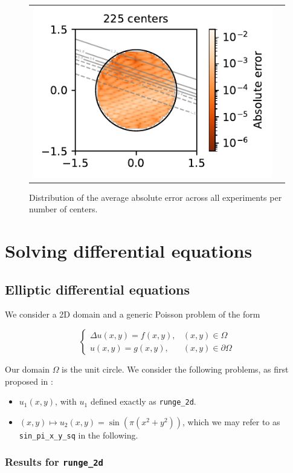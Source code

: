 \documentclass[12pt]{report} %
\newcommand{\mathLaplace}{\Delta}
\begin{document}
\begin{figure}
\begin{tabular}{ccl}
    \multicolumn{2}{l}{\includegraphics[width=.4\textwidth, clip=true,trim={0 0 2.1cm 0}]{imagenes/experiments/2d/statistical_2d_full_scheduler_interpolation/arctan_2d/arctan_paper_2d_225.pdf}} &
  \end{tabular}
  \caption{Distribution of the average absolute error across all experiments per number of centers.}
  \label{fig:arctan-2d-results-errors-avg}
\end{figure}

\clearpage
\section{Solving differential equations}

\subsection*{Elliptic differential equations}

We consider a 2D domain and a generic Poisson problem of the form

\begin{equation}
  \left\{\begin{array}{ll}
    \mathLaplace u (x, y) = f (x, y), & (x, y) \in \Omega          \\
    u (x, y) = g (x, y),              & (x, y) \in \partial \Omega
  \end{array}\right. \label{eqn:poisson}
\end{equation}

Our domain $\Omega$ is the unit circle. We consider the following problems, as first proposed in \cite{larsson2003numerical}:

\begin{itemize}
  \item $u_1(x,y)$, with $u_1$ defined exactly as \texttt{runge\_2d}.
  \item $(x,y) \mapsto u_2(x,y)=\sin(\pi(x^2+y^2))$, which we may refer to as \texttt{sin\_pi\_x\_y\_sq} in the following.
\end{itemize}

\subsubsection*{Results for \texttt{runge\_2d}}
\end{document}
